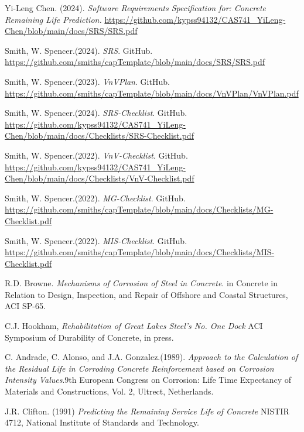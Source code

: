 \documentclass[12pt, titlepage]{article}
\begin{document}
\begin{thebibliography}{9} 
    Yi-Leng Chen. (2024). \textit{Software Requirements Specification for: Concrete Remaining Life Prediction.}    \url{https://github.com/kypss94132/CAS741_YiLeng-Chen/blob/main/docs/SRS/SRS.pdf}

    Smith, W. Spencer.(2024). \textit{SRS}. GitHub. \url{https://github.com/smiths/capTemplate/blob/main/docs/SRS/SRS.pdf}
    
    Smith, W. Spencer.(2023). \textit{VnVPlan}. GitHub. \url{https://github.com/smiths/capTemplate/blob/main/docs/VnVPlan/VnVPlan.pdf}

    Smith, W. Spencer.(2024). \textit{SRS-Checklist}. GitHub. \url{https://github.com/kypss94132/CAS741_YiLeng-Chen/blob/main/docs/Checklists/SRS-Checklist.pdf}

    Smith, W. Spencer.(2022). \textit{VnV-Checklist}. GitHub. \url{https://github.com/kypss94132/CAS741_YiLeng-Chen/blob/main/docs/Checklists/VnV-Checklist.pdf}

    Smith, W. Spencer.(2022). \textit{MG-Checklist}. GitHub. \url{https://github.com/smiths/capTemplate/blob/main/docs/Checklists/MG-Checklist.pdf}

    Smith, W. Spencer.(2022). \textit{MIS-Checklist}. GitHub. \url{https://github.com/smiths/capTemplate/blob/main/docs/Checklists/MIS-Checklist.pdf}

    R.D. Browne. \textit{Mechanisms of Corrosion of Steel in Concrete}. in Concrete in Relation to Design, Inspection, and Repair of Offshore and Coastal Structures, ACI SP-65.

    C.J. Hookham, \textit{Rehabilitation of Great Lakes Steel’s No. One Dock} ACI Symposium of Durability of Concrete, in press.

    C. Andrade, C. Alonso, and J.A. Gonzalez.(1989). \textit{Approach to the Calculation of the Residual Life in Corroding Concrete Reinforcement based on Corrosion Intensity Values}.9th European Congress on Corrosion: Life Time Expectancy of Materials and Constructions, Vol. 2, Ultrect, Netherlands.

    J.R. Clifton. (1991) \textit{Predicting the Remaining Service Life of Concrete} NISTIR 4712, National Institute of Standards and Technology.
    
\end{thebibliography}
\newpage
\end{document}
